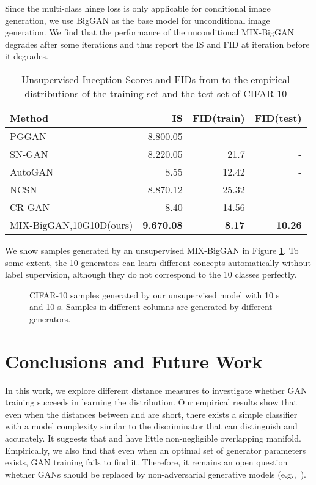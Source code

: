 \documentclass[conference]{IEEEtran}
\newcommand{\eg}{{e.g.,~}}
\begin{document}
Since the multi-class hinge loss is only applicable for conditional image generation, we use BigGAN\cite{biggan} as the base model for unconditional image generation. We find that the performance of the unconditional MIX-BigGAN degrades after some iterations and thus report the IS and FID at iteration  before it degrades.
\begin{table}[!h]
	\centering
	\begin{tabular}{l|r|r|r}
		Method &IS&FID(train)&FID(test)\\\hline
		PGGAN\cite{PGGAN}&8.800.05&-&-\\
		SN-GAN\cite{spectralnorm}&8.220.05&21.7&-\\
		AutoGAN\cite{AutoGAN}&8.55&12.42& -\\
		NCSN\cite{NCSN}&8.870.12&25.32&-\\
		CR-GAN\cite{cr-biggan}&8.40&14.56&-\\	
		MIX-BigGAN,10G10D(ours)&\bf9.670.08&\bf8.17&\bf10.26\\
	\end{tabular}
	\caption{\label{unsupervised_table}Unsupervised Inception Scores and FIDs from  to the empirical distributions of the training set and the test set of CIFAR-10}
\end{table}

We show samples generated by an unsupervised MIX-BigGAN in Figure \ref{unsupervised}. To some extent, the 10 generators can learn different concepts automatically without label supervision, although they do not correspond to the 10 classes perfectly.
\begin{figure}[!h]
	\begin{center}
	\end{center}
	\caption{CIFAR-10 samples generated by our unsupervised model with 10 s and 10 s. Samples in different columns are generated by different generators.}
	\label{unsupervised}
\end{figure} 


\section{Conclusions and Future Work}
In this work, we explore different distance measures to investigate whether GAN training succeeds in learning the distribution. Our empirical results show that even when the distances between  and  are short, there exists a simple classifier with a model complexity similar to the discriminator that can distinguish  and  accurately. It suggests that  and  have little non-negligible overlapping manifold\cite{towardsprincipled}.
Empirically, we also find that even when an optimal set of generator parameters exists, GAN training fails to find it. Therefore, it remains an open question whether GANs should be replaced by non-adversarial generative models (\eg \cite{glow,VQVAE2,VAE,NCSN,residualflow}).
\end{document}
